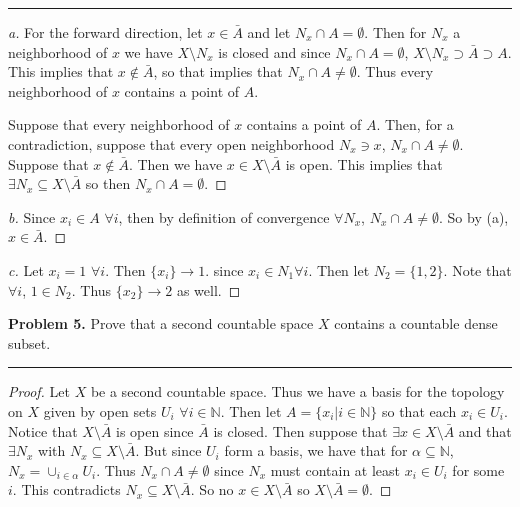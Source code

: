 \documentclass[leqno]{article}
\theoremstyle{nonumberplain}
\newtheorem{proof}{Proof}
\begin{document}
\noindent\rule[0.5ex]{\linewidth}{1pt}

\begin{proof}[a]
For the forward direction, let $x\in \bar{A}$ and let $N_x \cap A=\emptyset$.  Then for $N_x$ a neighborhood of $x$ we have $X\setminus N_x$ is closed and since $N_x\cap A=\emptyset$, $X\setminus N_x\supset \bar{A}\supset A$. This implies that $x\notin \bar{A}$, so that implies that $N_x\cap A\neq \emptyset$. Thus every neighborhood of $x$ contains a point of $A$.

Suppose that every neighborhood of $x$ contains a point of $A$. Then, for a contradiction, suppose that every open neighborhood $N_x \ni x$, $N_x \cap A\neq \emptyset$. Suppose that $x\notin \bar{A}$. Then we have $x\in X\setminus \bar{A}$ is open.  This implies that $\exists N_x \subseteq X\setminus \bar{A}$ so then $N_x\cap A =\emptyset$.
\end{proof}

\begin{proof}[b]
Since $x_i\in A$ $\forall i$, then by definition of convergence $\forall N_x$, $N_x\cap A\neq \emptyset$. So by (a), $x\in \bar{A}$.
\end{proof}

\begin{proof}[c]
Let $x_i=1$ $\forall i$. Then $\{x_i\}\to 1$. since $x_i\in N_1 \forall i$. Then let $N_2=\{1,2\}$.  Note that $\forall i$, $1\in N_2$. Thus $\{x_2\}\to 2$ as well. 
\end{proof}

\pagebreak




\noindent\textbf{Problem 5.} Prove that a second countable space $X$ contains a countable dense subset.

\noindent\rule[0.5ex]{\linewidth}{1pt}

\begin{proof}
Let $X$ be a second countable space.  Thus we have a basis for the topology on $X$ given by open sets $U_i$ $\forall i\in \mathbb{N}$.  Then let $A=\{x_i \vert i \in \mathbb{N}\}$ so that each $x_i \in U_i$.  Notice that $X\setminus \bar{A}$ is open since $\bar{A}$ is closed.  Then suppose that $\exists x \in X\setminus \bar{A}$ and that $\exists N_x$ with $N_x\subseteq X\setminus \bar{A}$.  But since $U_i$ form a basis, we have that for $\alpha \subseteq \mathbb{N}$, $N_x=\cup_{i\in\alpha}U_i$.  Thus $N_x\cap A \neq \emptyset$ since $N_x$ must contain at least $x_i\in U_i$ for some $i$. This contradicts $N_x\subseteq X\setminus \bar{A}$.  So no $x\in X\setminus \bar{A}$ so $X\setminus \bar{A}=\emptyset$.
\end{proof}

\pagebreak
\end{document}
